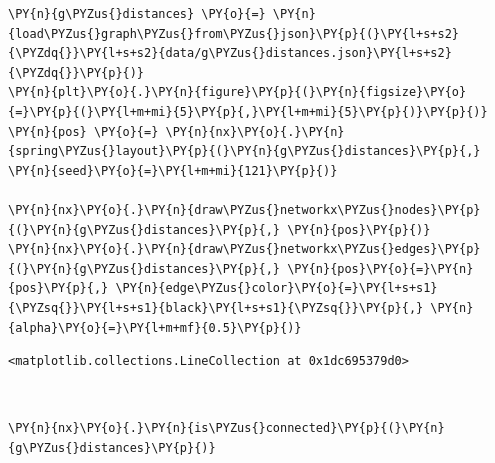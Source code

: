     \begin{tcolorbox}[breakable, size=fbox, boxrule=1pt, pad at break*=1mm,colback=cellbackground, colframe=cellborder]
\begin{Verbatim}[commandchars=\\\{\}]
\PY{n}{g\PYZus{}distances} \PY{o}{=} \PY{n}{load\PYZus{}graph\PYZus{}from\PYZus{}json}\PY{p}{(}\PY{l+s+s2}{\PYZdq{}}\PY{l+s+s2}{data/g\PYZus{}distances.json}\PY{l+s+s2}{\PYZdq{}}\PY{p}{)}
\PY{n}{plt}\PY{o}{.}\PY{n}{figure}\PY{p}{(}\PY{n}{figsize}\PY{o}{=}\PY{p}{(}\PY{l+m+mi}{5}\PY{p}{,}\PY{l+m+mi}{5}\PY{p}{)}\PY{p}{)}
\PY{n}{pos} \PY{o}{=} \PY{n}{nx}\PY{o}{.}\PY{n}{spring\PYZus{}layout}\PY{p}{(}\PY{n}{g\PYZus{}distances}\PY{p}{,} \PY{n}{seed}\PY{o}{=}\PY{l+m+mi}{121}\PY{p}{)}

\PY{n}{nx}\PY{o}{.}\PY{n}{draw\PYZus{}networkx\PYZus{}nodes}\PY{p}{(}\PY{n}{g\PYZus{}distances}\PY{p}{,} \PY{n}{pos}\PY{p}{)}
\PY{n}{nx}\PY{o}{.}\PY{n}{draw\PYZus{}networkx\PYZus{}edges}\PY{p}{(}\PY{n}{g\PYZus{}distances}\PY{p}{,} \PY{n}{pos}\PY{o}{=}\PY{n}{pos}\PY{p}{,} \PY{n}{edge\PYZus{}color}\PY{o}{=}\PY{l+s+s1}{\PYZsq{}}\PY{l+s+s1}{black}\PY{l+s+s1}{\PYZsq{}}\PY{p}{,} \PY{n}{alpha}\PY{o}{=}\PY{l+m+mf}{0.5}\PY{p}{)}
\end{Verbatim}
\end{tcolorbox}

            \begin{tcolorbox}[breakable, size=fbox, boxrule=.5pt, pad at break*=1mm, opacityfill=0]
\begin{Verbatim}[commandchars=\\\{\}]
<matplotlib.collections.LineCollection at 0x1dc695379d0>
\end{Verbatim}
\end{tcolorbox}
        
    \begin{center}
    \end{center}
    { \hspace*{\fill} \\}
    
    \begin{tcolorbox}[breakable, size=fbox, boxrule=1pt, pad at break*=1mm,colback=cellbackground, colframe=cellborder]
\begin{Verbatim}[commandchars=\\\{\}]
\PY{n}{nx}\PY{o}{.}\PY{n}{is\PYZus{}connected}\PY{p}{(}\PY{n}{g\PYZus{}distances}\PY{p}{)}
\end{Verbatim}
\end{tcolorbox}

